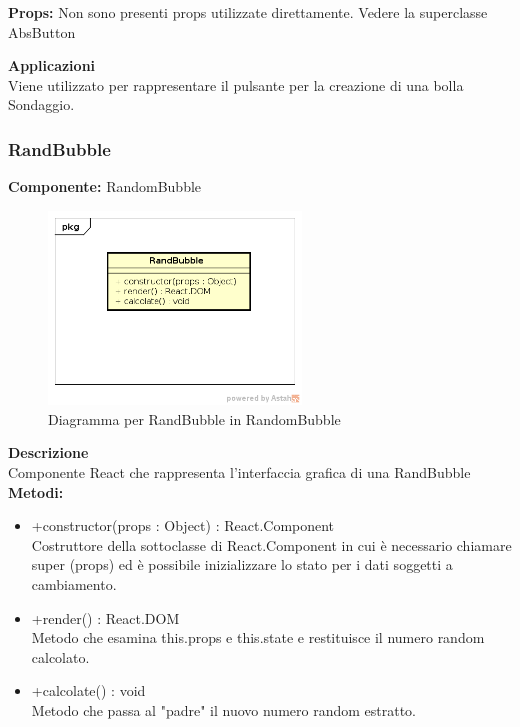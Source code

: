 \textbf{Props:} 
Non sono presenti props utilizzate direttamente. Vedere la superclasse AbsButton 


\textbf{Applicazioni}\\
Viene utilizzato per rappresentare il pulsante per la creazione di una bolla Sondaggio. 


\clearpage

\subsubsection{RandBubble}
\textbf{Componente:}  RandomBubble\\
   \FloatBarrier
   \begin{figure}[ht]
   \centering
   \includegraphics[width=0.6\textwidth]{img/single-RandBubble.png}
   \caption{{Diagramma per RandBubble in RandomBubble}}
\end{figure}
\FloatBarrier
\textbf{Descrizione}\\
Componente React che rappresenta l'interfaccia grafica di una RandBubble
\\
\textbf{Metodi:} 
\begin{itemize}
\item +constructor(props : Object) : React.Component 
\\
Costruttore della sottoclasse di React.Component in cui è necessario chiamare super (props) ed è possibile inizializzare lo stato per i dati soggetti a cambiamento. 

\item +render() : React.DOM 
\\
Metodo che esamina this.props e this.state e restituisce il numero random calcolato. 

\item +calcolate() : void \\
Metodo che passa al "padre" il nuovo numero random estratto.
\end{itemize}

